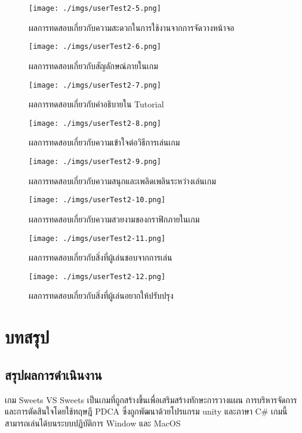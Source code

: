\documentclass[12pt,oneside,openright,a4paper]{cpe-thai-project}
\begin{document}
  \begin{figure}[H]\centering
    \texttt{[image: ./imgs/userTest2-5.png]}
    \caption{ผลการทดสอบเกี่ยวกับความสะดวกในการใช้งานจากการจัดวางหน้าจอ}\label{fig:userTest2-5}
  \end{figure}
  \begin{figure}[H]\centering
    \texttt{[image: ./imgs/userTest2-6.png]}
    \caption{ผลการทดสอบเกี่ยวกับสัญลักษณ์ภายในเกม}\label{fig:userTest2-6}
  \end{figure}
  \begin{figure}[H]\centering
    \texttt{[image: ./imgs/userTest2-7.png]}
    \caption{ผลการทดสอบเกี่ยวกับคำอธิบายใน Tutorial}\label{fig:userTest2-7}
  \end{figure}
  \begin{figure}[H]\centering
    \texttt{[image: ./imgs/userTest2-8.png]}
    \caption{ผลการทดสอบเกี่ยวกับความเข้าใจต่อวิธีการเล่นเกม}\label{fig:userTest2-8}
  \end{figure}
  \begin{figure}[H]\centering
    \texttt{[image: ./imgs/userTest2-9.png]}
    \caption{ผลการทดสอบเกี่ยวกับความสนุกและเพลิดเพลินระหว่างเล่นเกม}\label{fig:userTest2-9}
  \end{figure}
  \begin{figure}[H]\centering
    \texttt{[image: ./imgs/userTest2-10.png]}
    \caption{ผลการทดสอบเกี่ยวกับความสวยงามของกราฟิกภายในเกม}\label{fig:userTest2-10}
  \end{figure}
  \begin{figure}[H]\centering
    \texttt{[image: ./imgs/userTest2-11.png]}
    \caption{ผลการทดสอบเกี่ยวกับสิ่งที่ผู้เล่นชอบจากการเล่น}\label{fig:userTest2-11}
  \end{figure}
  \begin{figure}[H]\centering
    \texttt{[image: ./imgs/userTest2-12.png]}
    \caption{ผลการทดสอบเกี่ยวกับสิ่งที่ผู้เล่นอยากให้ปรับปรุง}\label{fig:userTest2-12}
  \end{figure}


\chapter{บทสรุป}
\section{สรุปผลการดำเนินงาน}
  เกม Sweets VS Sweets เป็นเกมที่ถูกสร้างขึ้นเพื่อเสริมสร้างทักษะการวางแผน การบริหารจัดการ 
  และการตัดสินใจโดยใช้ทฤษฎี PDCA ซึ่งถูกพัฒนาด้วยโปรแกรม unity และภาษา C\#  
  เกมนี้สามารถเล่นได้บนระบบปฏิบัติการ Window และ MacOS  
\end{document}
